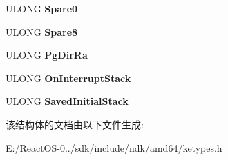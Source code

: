 \begin{DoxyCompactItemize}
U\+L\+O\+NG {\bfseries Spare0}
\item 
\mbox{\label{struct___k_i_p_c_r_a22450cb1d3fa346b3ce1df52136a415b}} 
U\+L\+O\+NG {\bfseries Spare8}
\item 
\mbox{\label{struct___k_i_p_c_r_af6264f02745402395f2fc33e9c0c372d}} 
U\+L\+O\+NG {\bfseries Pg\+Dir\+Ra}
\item 
\mbox{\label{struct___k_i_p_c_r_ad146bc4232bb78cca76fc2cd2d265776}} 
U\+L\+O\+NG {\bfseries On\+Interrupt\+Stack}
\item 
\mbox{\label{struct___k_i_p_c_r_ab216eb5715ed25fa11936c2da3a07c95}} 
U\+L\+O\+NG {\bfseries Saved\+Initial\+Stack}
\end{DoxyCompactItemize}


该结构体的文档由以下文件生成\+:\begin{DoxyCompactItemize}
\item 
E\+:/\+React\+O\+S-\/0../sdk/include/ndk/amd64/ketypes.\+h\end{DoxyCompactItemize}
